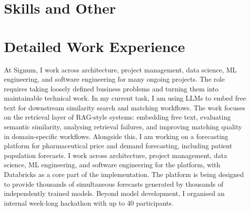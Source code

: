 \documentclass[11pt,a4paper]{moderncv}
\begin{document}


\section{Skills and Other}
\normalsize
{}


\newpage

\section{Detailed Work Experience}

\label{sec:signum}
 {
    At Signum, I work across architecture, project management, data science, ML engineering, and software engineering for many ongoing projects. The role requires taking loosely defined business problems and turning them into maintainable technical work.
    \newline\hspace*{2em}
    In my current task, I am using LLMs to embed free text for downstream similarity search and matching workflows. The work focuses on the retrieval layer of RAG-style systems: embedding free text, evaluating semantic similarity, analysing retrieval failures, and improving matching quality in domain-specific workflows.
    \newline\hspace*{2em}
    Alongside this, I am working on a forecasting platform for pharmaceutical price and demand forecasting, including patient population forecasts. I work across architecture, project management, data science, ML engineering, and software engineering for the platform, with Databricks as a core part of the implementation. The platform is being designed to provide thousands of simultaneous forecasts generated by thousands of independently trained models.
    \newline\hspace*{2em}
    Beyond model development, I organised an internal week-long hackathon with up to 40 participants.
}{}
\end{document}
